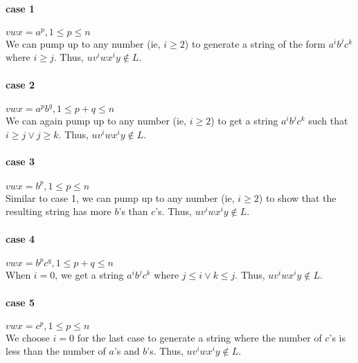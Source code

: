 \documentclass[11pt,letterpaper]{article}
\begin{document}
\paragraph{case 1} $vwx = a^p, 1 \leq p \leq n$ \\
We can pump up to any number (ie, $i \geq 2$) to generate a string of the form $a^i b^j c^k$ where $i \geq j$. Thus, $uv^iwx^iy \notin L$.

\paragraph{case 2} $vwx = a^p b^q, 1 \leq p+q \leq n$ \\
We can again pump up to any number (ie, $i \geq 2$) to get a string $a^i b^j c^k$ such that $i \geq j \vee j \geq k$. Thus, $uv^iwx^iy \notin L$.

\paragraph{case 3} $vwx = b^p, 1 \leq p \leq n$ \\
Similar to case 1, we can pump up to any number (ie, $i \geq 2$) to show that the resulting string has more $b$'s than $c$'s. Thus, $uv^iwx^iy \notin L$.

\paragraph{case 4} $vwx = b^p c^q, 1 \leq p+q \leq n$ \\
When $i=0$, we get a string $a^i b^j c^k$ where $j \leq i \vee k \leq j$. Thus, $uv^iwx^iy \notin L$.

\paragraph{case 5} $vwx = c^p, 1 \leq p \leq n$ \\
We choose $i=0$ for the last case to generate a string where the number of $c$'s is less than the number of $a$'s and $b$'s. Thus, $uv^iwx^iy \notin L$.
\end{document}
